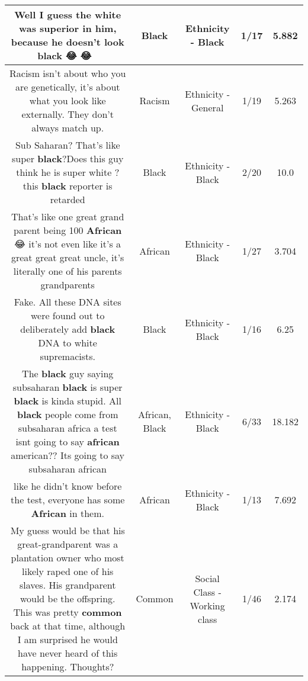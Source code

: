 \documentclass[11pt]{article}
\newlength\mylength
\begin{document}
\begin{center}
\begin{longtable}{|C{.65\mylength}|C{.30\mylength}|C{.12\mylength}|C{.12\mylength}|C{.12\mylength}|}
  \small Well I guess the white was superior in him, because he doesn't look \textbf{black} 😂 😂 🤣\normalsize   & Black & Ethnicity - Black & 1/17 & 5.882 \\  \hline
  \small Racism isn't about who you are genetically, it's about what you look like externally. They don't always match up.\normalsize   & Racism & Ethnicity - General & 1/19 & 5.263 \\  \hline
  \small Sub  Saharan? That's like super \textbf{black}?Does this guy think he is super white ?this \textbf{black} reporter is retarded\normalsize   & Black & Ethnicity - Black & 2/20 & 10.0 \\  \hline
  \small That's like one great grand parent being 100 \textbf{African} 😂 it's not even like it's a great great great uncle, it's literally one of his parents grandparents\normalsize   & African & Ethnicity - Black & 1/27 & 3.704 \\  \hline
  \small Fake. All these DNA sites were found out to deliberately add \textbf{black} DNA to white supremacists.\normalsize   & Black & Ethnicity - Black & 1/16 & 6.25 \\  \hline
  \small The \textbf{black} guy saying subsaharan \textbf{black} is super \textbf{black} is kinda stupid. All \textbf{black} people come from subsaharan africa a test isnt going to say \textbf{african} american?? Its going to say subsaharan african\normalsize   & African, Black & Ethnicity - Black & 6/33 & 18.182 \\  \hline
  \small like he didn't know before the test, everyone has some \textbf{African} in them.\normalsize   & African & Ethnicity - Black & 1/13 & 7.692 \\  \hline
  \small My guess would be that his great-grandparent was a plantation owner who most likely raped one of his slaves. His grandparent would be the offspring. This was pretty \textbf{common} back at that time, although I am surprised he would have never heard of this happening. Thoughts?\normalsize   & Common & Social Class - Working class & 1/46 & 2.174 \\  \hline

\end{longtable}
\end{center}
\end{document}
